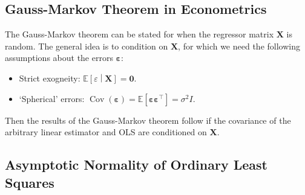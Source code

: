 \documentclass[11pt]{report} %
\begin{document}
\subsection{Gauss-Markov Theorem in Econometrics}

The Gauss-Markov theorem can be stated for when the regressor matrix $\mathbf{X}$ is random. The general idea is to condition on $\mathbf{X}$, for which we need the following assumptions about the errors $\boldsymbol{\varepsilon}$:
\begin{itemize}
\item Strict exogneity: $\mathbb{E}\left[\varepsilon\middle|\mathbf{X}\right] = \mathbf{0}$.
\item `Spherical' errors: $\operatorname{Cov}\left(\boldsymbol{\varepsilon}\right) = \mathbb{E}\left[\boldsymbol{\varepsilon}\boldsymbol{\varepsilon}^{\top}\right] = \sigma^{2}I$.
\end{itemize}
Then the results of the Gauss-Markov theorem follow if the covariance of the arbitrary linear estimator and OLS are conditioned on $\mathbf{X}$.

\subsection{Asymptotic Normality of Ordinary Least Squares}
\end{document}
